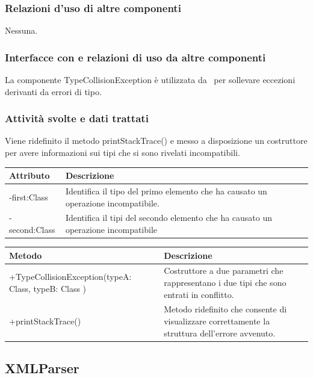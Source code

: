 \documentclass[11pt,titlepage,a4paper]{report}
\begin{document}
\subsubsection{Relazioni d'uso di altre componenti}
Nessuna.
\subsubsection{Interfacce con e relazioni di uso da altre componenti}
La componente TypeCollisionException \`e utilizzata da \brp\ per sollevare eccezioni derivanti da errori di tipo.
\subsubsection{Attivit\`a svolte e dati trattati}
Viene ridefinito il metodo printStackTrace() e messo a disposizione un costruttore per avere informazioni sui tipi che si sono rivelati incompatibili.
\begin{center}
\begin{tabular}{||p{6cm}||p{6cm}||} \hline
\hline
Attributo & Descrizione \\  \hline
-first:Class & Identifica il tipo del primo elemento che ha causato un operazione incompatibile. \\ \hline
-second:Class & Identifica il tipi del secondo elemento che ha causato un operazione incompatibile \\ \hline
\end{tabular}
\end{center}
\begin{center}
\begin{tabular}{||p{6cm}||p{6cm}||} \hline
\hline
Metodo & Descrizione \\  \hline
+TypeCollisionException(typeA: Class, typeB: Class ) & Costruttore a due parametri che rappresentano i due tipi che sono entrati in conflitto.\\ \hline
+printStackTrace() & Metodo ridefinito che consente di visualizzare correttamente la struttura dell'errore avvenuto.\\ \hline
\end{tabular}
\end{center}

\subsection{XMLParser}%
\end{document}

